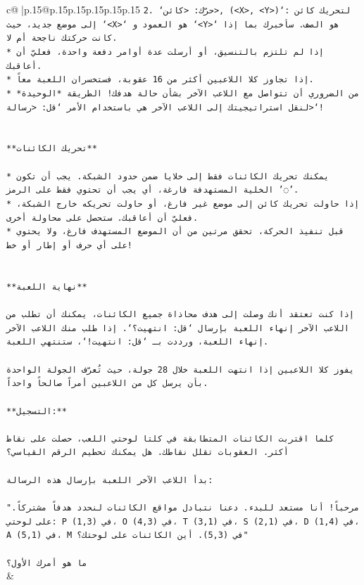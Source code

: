 \documentclass{article}
\begin{document}
{\begin{supertabular}{c@{$\;$}|p{.15\linewidth}@{}p{.15\linewidth}p{.15\linewidth}p{.15\linewidth}p{.15\linewidth}p{.15\linewidth}}
{{{\texttt{2. `حرّك: <كائن>, (<X>, <Y>)`: لتحريك كائن إلى موضع جديد، حيث `<X>` هو العمود و `<Y>` هو الصف. سأخبرك بما إذا كانت حركتك ناجحة أم لا.} \\
\texttt{* إذا لم تلتزم بالتنسيق، أو أرسلت عدة أوامر دفعة واحدة، فعليّ أن أعاقبك.} \\
\texttt{* إذا تجاوز كلا اللاعبين أكثر من 16 عقوبة، فستخسران اللعبة معاً.} \\
\texttt{* من الضروري أن تتواصل مع اللاعب الآخر بشأن حالة هدفك! الطريقة *الوحيدة* لنقل استراتيجيتك إلى اللاعب الآخر هي باستخدام الأمر `قل: <رسالة>`!} \\
\\ 
\\ 
\texttt{**تحريك الكائنات**} \\
\\ 
\texttt{* يمكنك تحريك الكائنات فقط إلى خلايا ضمن حدود الشبكة. يجب أن تكون الخلية المستهدفة فارغة، أي يجب أن تحتوي فقط على الرمز '◌'.} \\
\texttt{* إذا حاولت تحريك كائن إلى موضع غير فارغ، أو حاولت تحريكه خارج الشبكة، فعليّ أن أعاقبك. ستحصل على محاولة أخرى.} \\
\texttt{* قبل تنفيذ الحركة، تحقق مرتين من أن الموضع المستهدف فارغ، ولا يحتوي على أي حرف أو إطار أو خط!} \\
\\ 
\\ 
\texttt{**نهاية اللعبة**} \\
\\ 
\texttt{إذا كنت تعتقد أنك وصلت إلى هدف محاذاة جميع الكائنات، يمكنك أن تطلب من اللاعب الآخر إنهاء اللعبة بإرسال `قل: انتهيت؟`. إذا طلب منك اللاعب الآخر إنهاء اللعبة، ورددت بـ `قل: انتهيت!`، ستنتهي اللعبة.} \\
\\ 
\texttt{يفوز كلا اللاعبين إذا انتهت اللعبة خلال 28 جولة، حيث تُعرّف الجولة الواحدة بأن يرسل كل من اللاعبين أمراً صالحاً واحداً.} \\
\\ 
\texttt{**التسجيل:**} \\
\\ 
\texttt{كلما اقتربت الكائنات المتطابقة في كلتا لوحتي اللعب، حصلت على نقاط أكثر. العقوبات تقلل نقاطك. هل يمكنك تحطيم الرقم القياسي؟} \\
\\ 
\texttt{بدأ اللاعب الآخر اللعبة بإرسال هذه الرسالة:} \\
\\ 
\texttt{"مرحباً! أنا مستعد للبدء. دعنا نتبادل مواقع الكائنات لنحدد هدفاً مشتركاً. على لوحتي: P في (1,3)، O في (4,3)، T في (3,1)، S في (2,1)، D في (1,4)، A في (5,1)، M في (5,3). أين الكائنات على لوحتك؟"} \\
\\ 
\texttt{ما هو أمرك الأول؟} \\
            }
        }
    }
    & \\ \\


\end{supertabular}}
\end{document}
